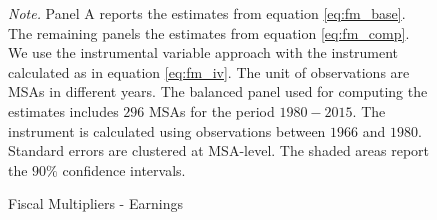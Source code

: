 \documentclass[dv_diss_main.tex]{subfiles}
\begin{document}
\begin{figure}[H]
\begin{center}
\begin{tabular}[c]{ccc}
    
    
    \end{tabular}
        \caption{Fiscal Multipliers - Earnings}
    \end{center}
    

 
    \footnotesize{\textit{Note. } Panel A reports the estimates from equation \eqref{eq:fm_base}. The remaining panels the estimates from equation \eqref{eq:fm_comp}. We use the instrumental variable approach with the instrument calculated as in equation \eqref{eq:fm_iv}. The unit of observations are MSAs in different years. The balanced panel used for computing the estimates includes $296$ MSAs for the period $1980-2015$. The instrument is calculated using observations between $1966$ and $1980$. Standard errors are clustered at MSA-level. The shaded areas report the $90\%$ confidence intervals.}

    \label{fig:fm_earnings}
\end{figure}
\newpage
\end{document}
